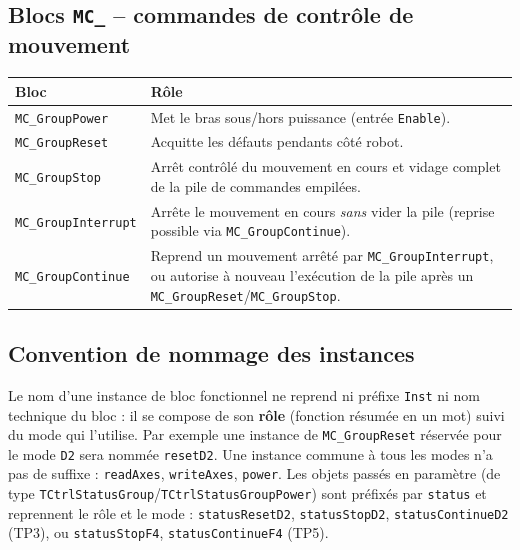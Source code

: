 \subsection{Blocs \texttt{MC\_} -- commandes de contrôle de mouvement}

\begin{center}
    \begin{tabular}{|p{4.6cm}|p{9.6cm}|}
        \hline
        \textbf{Bloc} & \textbf{Rôle} \\
        \hline
        \texttt{MC\_GroupPower} & Met le bras sous/hors puissance (entrée \texttt{Enable}). \\
        \hline
        \texttt{MC\_GroupReset} & Acquitte les défauts pendants côté robot. \\
        \hline
        \texttt{MC\_GroupStop} & Arrêt contrôlé du mouvement en cours et vidage complet de la pile de commandes empilées. \\
        \hline
        \texttt{MC\_GroupInterrupt} & Arrête le mouvement en cours \emph{sans} vider la pile (reprise possible via \texttt{MC\_GroupContinue}). \\
        \hline
        \texttt{MC\_GroupContinue} & Reprend un mouvement arrêté par \texttt{MC\_GroupInterrupt}, ou autorise à nouveau l'exécution de la pile après un \texttt{MC\_GroupReset}/\texttt{MC\_GroupStop}. \\
        \hline
    \end{tabular}
\end{center}

\subsection{Convention de nommage des instances}

Le nom d'une instance de bloc fonctionnel ne reprend ni préfixe \texttt{Inst} ni nom technique du
bloc : il se compose de son \textbf{rôle} (fonction résumée en un mot) suivi du mode qui
l'utilise. Par exemple une instance de \texttt{MC\_GroupReset} réservée pour le mode \texttt{D2}
sera nommée \texttt{resetD2}. Une instance commune à tous les modes n'a pas de suffixe :
\texttt{readAxes}, \texttt{writeAxes}, \texttt{power}. Les objets passés en paramètre (de type
\texttt{TCtrlStatusGroup}/\texttt{TCtrlStatusGroupPower}) sont préfixés par \texttt{status} et
reprennent le rôle et le mode : \texttt{statusResetD2}, \texttt{statusStopD2},
\texttt{statusContinueD2} (TP3), ou \texttt{statusStopF4}, \texttt{statusContinueF4} (TP5).

